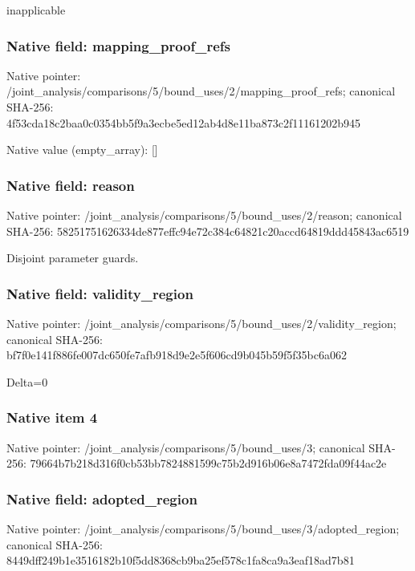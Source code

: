\documentclass[10pt,a4paper]{article}
\begin{document}
\begingroup\raggedright\sloppy inapplicable\par\endgroup

\subsubsection{Native field: mapping\_\allowbreak{}proof\_\allowbreak{}refs}
Native pointer: /joint\_\allowbreak{}analysis/comparisons/5/bound\_\allowbreak{}uses/2/mapping\_\allowbreak{}proof\_\allowbreak{}refs; canonical SHA-256: 4f53cda18c2baa0c0354bb5f9a3ecbe5ed12ab4d8e11ba873c2f11161202b945

Native value (empty\_\allowbreak{}array): []

\subsubsection{Native field: reason}
Native pointer: /joint\_\allowbreak{}analysis/comparisons/5/bound\_\allowbreak{}uses/2/reason; canonical SHA-256: 58251751626334de877effc94e72c384c64821c20accd64819ddd45843ac6519

\begingroup\raggedright\sloppy Disjoint parameter guards.\par\endgroup

\subsubsection{Native field: validity\_\allowbreak{}region}
Native pointer: /joint\_\allowbreak{}analysis/comparisons/5/bound\_\allowbreak{}uses/2/validity\_\allowbreak{}region; canonical SHA-256: bf7f0e141f886fe007dc650fe7afb918d9e2e5f606cd9b045b59f5f35bc6a062

\begingroup\raggedright\sloppy Delta=\allowbreak{}0\par\endgroup

\subsubsection{Native item 4}
Native pointer: /joint\_\allowbreak{}analysis/comparisons/5/bound\_\allowbreak{}uses/3; canonical SHA-256: 79664b7b218d316f0cb53bb7824881599c75b2d916b06e8a7472fda09f44ac2e

\subsubsection{Native field: adopted\_\allowbreak{}region}
Native pointer: /joint\_\allowbreak{}analysis/comparisons/5/bound\_\allowbreak{}uses/3/adopted\_\allowbreak{}region; canonical SHA-256: 8449dff249b1e3516182b10f5dd8368cb9ba25ef578c1fa8ca9a3eaf18ad7b81
\end{document}
